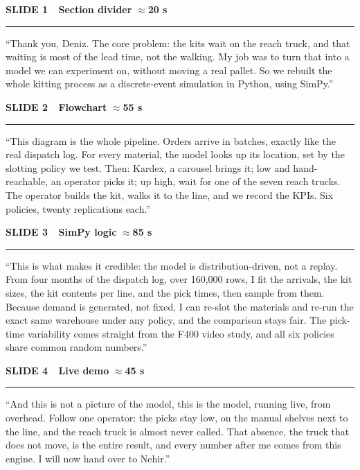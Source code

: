 \documentclass[11pt]{article}
\newcommand{\bg}{\fontsize{18}{22.5}\selectfont}
\newcommand{\sslide}[3]{%
  {\color{navy}\fontsize{13}{15}\selectfont\bfseries #1}\hfill%
  {\color{green}\fontsize{12}{14}\selectfont\bfseries #2}\par\nobreak%
  {\color{navy}\rule{\linewidth}{0.9pt}}\par\nobreak\vspace{4pt}%
  {\bg #3}\par}
\newcommand{\scut}{\par\vspace{7pt}\noindent{\color{grey}\rule{\linewidth}{0.4pt}}\par\vspace{7pt}}
\newcommand{\smid}{\par\vspace{16pt}\noindent{\color{grey}\rule{\linewidth}{0.8pt}}\par\vspace{16pt}}
\begin{document}
\sslide{SLIDE 1 \,\textperiodcentered\, Section divider}{\(\approx\)20 s}%
{``Thank you, Deniz. The core problem: the kits wait on the reach truck, and that waiting is
most of the lead time, not the walking. My job was to turn that into a model we can
experiment on, without moving a real pallet. So we rebuilt the whole kitting process as a
discrete-event simulation in Python, using SimPy.''}
\scut
\sslide{SLIDE 2 \,\textperiodcentered\, Flowchart}{\(\approx\)55 s}%
{``This diagram is the whole pipeline. Orders arrive in batches, exactly like the real
dispatch log. For every material, the model looks up its location, set by the slotting
policy we test. Then: Kardex, a carousel brings it; low and hand-reachable, an operator
picks it; up high, wait for one of the seven reach trucks. The operator builds the kit,
walks it to the line, and we record the KPIs. Six policies, twenty replications each.''}
\smid
\sslide{SLIDE 3 \,\textperiodcentered\, SimPy logic}{\(\approx\)85 s}%
{``This is what makes it credible: the model is distribution-driven, not a replay. From four
months of the dispatch log, over 160,000 rows, I fit the arrivals, the kit sizes, the kit
contents per line, and the pick times, then sample from them. Because demand is generated,
not fixed, I can re-slot the materials and re-run the exact same warehouse under any policy,
and the comparison stays fair. The pick-time variability comes straight from the F400 video
study, and all six policies share common random numbers.''}
\scut
\sslide{SLIDE 4 \,\textperiodcentered\, Live demo}{\(\approx\)45 s}%
{``And this is not a picture of the model, this is the model, running live, from overhead.
Follow one operator: the picks stay low, on the manual shelves next to the line, and the
reach truck is almost never called. That absence, the truck that does not move, is the
entire result, and every number after me comes from this engine. I will now hand over to
Nehir.''}
\clearpage
\end{document}
